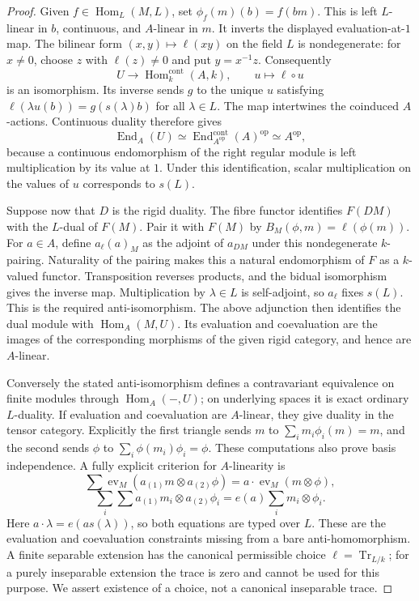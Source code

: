\begin{proof}
Given $f\in\operatorname{Hom}_L(M,L)$, set
$\phi_f(m)(b)=f(bm)$. This is left $L$-linear in $b$, continuous, and
$A$-linear in $m$. It inverts the displayed evaluation-at-$1$ map.
The bilinear form $(x,y)\longmapsto\ell(xy)$ on the field $L$ is
nondegenerate: for $x\ne0$, choose $z$ with $\ell(z)\ne0$ and put
$y=x^{-1}z$. Consequently
\[
 U\longrightarrow\operatorname{Hom}^{\mathrm{cont}}_k(A,k),
 \qquad u\longmapsto\ell\circ u
\]
is an isomorphism. Its inverse sends $g$ to the unique $u$ satisfying
$\ell(\lambda u(b))=g(s(\lambda)b)$ for all $\lambda\in L$.
The map intertwines the coinduced $A$-actions. Continuous duality
therefore gives
\[
 \operatorname{End}_A(U)
 \simeq\operatorname{End}_{A^{\mathrm{op}}}^{\mathrm{cont}}(A)^{\mathrm{op}}
 \simeq A^{\mathrm{op}},
\]
because a continuous endomorphism of the right regular module is
left multiplication by its value at $1$. Under this identification,
scalar multiplication on the values of $u$ corresponds to $s(L)$.

Suppose now that $D$ is the rigid duality. The fibre functor identifies
$F(DM)$ with the $L$-dual of $F(M)$. Pair it with $F(M)$ by
$B_M(\phi,m)=\ell(\phi(m))$. For $a\in A$, define
$a_\ell(a)_M$ as the adjoint of $a_{DM}$ under this nondegenerate
$k$-pairing. Naturality of the pairing makes this a natural
endomorphism of $F$ as a $k$-valued functor. Transposition reverses
products, and the bidual isomorphism gives the inverse map.
Multiplication by $\lambda\in L$ is self-adjoint, so $a_\ell$ fixes
$s(L)$. This is the required anti-isomorphism. The above adjunction
then identifies the dual module with $\operatorname{Hom}_A(M,U)$.
Its evaluation and coevaluation are the images of the corresponding
morphisms of the given rigid category, and hence are $A$-linear.

Conversely the stated anti-isomorphism defines a contravariant
equivalence on finite modules through $\operatorname{Hom}_A(-,U)$;
on underlying spaces it is exact ordinary $L$-duality. If evaluation
and coevaluation are $A$-linear, they give duality in the tensor
category. Explicitly the first triangle sends
$m$ to $\sum_i m_i\phi_i(m)=m$, and the second sends
$\phi$ to $\sum_i\phi(m_i)\phi_i=\phi$. These computations also prove
basis independence. A fully explicit criterion for $A$-linearity is
\[
 \sum\operatorname{ev}_M(a_{(1)}m\otimes a_{(2)}\phi)
 =a\cdot\operatorname{ev}_M(m\otimes\phi),
\]
\[
 \sum_i\sum a_{(1)}m_i\otimes a_{(2)}\phi_i
 =e(a)\sum_i m_i\otimes\phi_i.
\]
Here $a\cdot\lambda=e(a s(\lambda))$, so both equations are typed
over $L$. These are the evaluation and coevaluation constraints
missing from a bare anti-homomorphism. A finite separable extension
has the canonical permissible choice $\ell=\operatorname{Tr}_{L/k}$;
for a purely inseparable extension the trace is zero and cannot be
used for this purpose. We assert existence of a choice, not a
canonical inseparable trace.
\end{proof}

